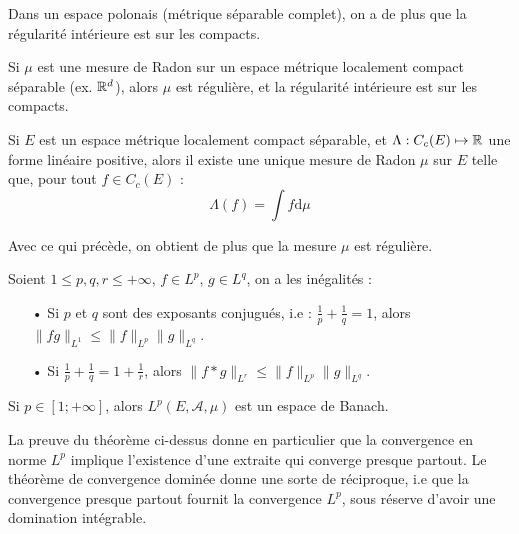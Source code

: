 \documentclass[11pt,a4paper]{article}
\begin{document}
\begin{rmq}
Dans un espace polonais (métrique séparable complet), on a de plus que la régularité intérieure est sur les compacts.
\end{rmq}

\begin{thm}
Si $\mu$ est une mesure de Radon sur un espace métrique localement compact séparable (ex. $\mathbb R^d$), alors $\mu$ est régulière, et  la régularité intérieure est sur les compacts. 
\end{thm}

\begin{thm}
Si $E$ est un espace métrique localement compact séparable, et $\Lambda : C_c(E) \mapsto \mathbb R$ une forme linéaire positive, alors il existe une unique mesure de Radon $\mu$ sur $E$ telle que, pour tout $f\in C_c(E)$ : 
\[\Lambda(f) = \int f \mathrm{d}\mu\]
\end{thm}

\begin{rmq}
Avec ce qui précède, on obtient de plus que la mesure $\mu$ est régulière.
\end{rmq}

\begin{thm}
Soient $ 1 \leq p,q,r \leq +\infty$, $f\in L^p$, $g \in L^q$, on a les inégalités :
\begin{itemize}
\item[•] Si $p$ et $q$ sont des exposants conjugués, i.e : $\frac{1}{p} + \frac{1}{q} = 1$, alors $\|fg\|_{L^1} \leq \|f\|_{L^p}\|g\|_{L^q}$.
\item[•] Si $\frac{1}{p} + \frac{1}{q} = 1 + \frac{1}{r}$, alors $\|f*g\|_{L^r} \leq \|f\|_{L^p}\|g\|_{L^q}$.
\end{itemize}
\end{thm}

\begin{thm}
Si $p \in [1; +\infty]$, alors $L^p(E,\mathcal{A},\mu)$ est un espace de Banach.
\end{thm}


\begin{rmq}
La preuve du théorème ci-dessus donne en particulier que la convergence en norme $L^p$ implique l'existence d'une extraite qui converge presque partout. Le théorème de convergence dominée donne une sorte de réciproque, i.e que la convergence presque partout fournit la convergence $L^p$, sous réserve d'avoir une domination intégrable.
\end{rmq}
\end{document}
